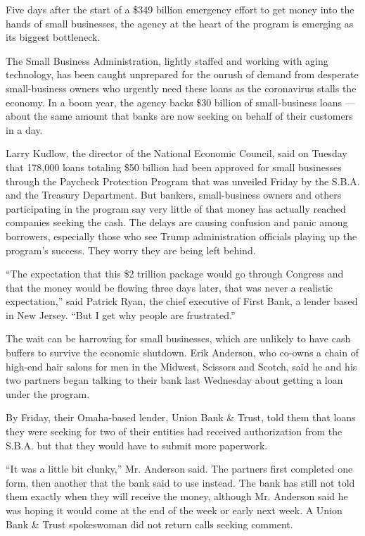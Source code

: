 Five days after the start of a \$349 billion emergency effort to get
money into the hands of small businesses, the agency at the heart of the
program is emerging as its biggest bottleneck.

The Small Business Administration, lightly staffed and working with
aging technology, has been caught unprepared for the onrush of demand
from desperate small-business owners who urgently need these loans as
the coronavirus stalls the economy. In a boom year, the agency backs
\$30 billion of small-business loans --- about the same amount that
banks are now seeking on behalf of their customers in a day.

Larry Kudlow, the director of the National Economic Council, said on
Tuesday that 178,000 loans totaling \$50 billion had been approved for
small businesses through the Paycheck Protection Program that was
unveiled Friday by the S.B.A. and the Treasury Department. But bankers,
small-business owners and others participating in the program say very
little of that money has actually reached companies seeking the cash.
The delays are causing confusion and panic among borrowers, especially
those who see Trump administration officials playing up the program's
success. They worry they are being left behind.

``The expectation that this \$2 trillion package would go through
Congress and that the money would be flowing three days later, that was
never a realistic expectation,'' said Patrick Ryan, the chief executive
of First Bank, a lender based in New Jersey. ``But I get why people are
frustrated.''

The wait can be harrowing for small businesses, which are unlikely to
have cash buffers to survive the economic shutdown. Erik Anderson, who
co-owns a chain of high-end hair salons for men in the Midwest, Scissors
and Scotch, said he and his two partners began talking to their bank
last Wednesday about getting a loan under the program.

By Friday, their Omaha-based lender, Union Bank \& Trust, told them that
loans they were seeking for two of their entities had received
authorization from the S.B.A. but that they would have to submit more
paperwork.

``It was a little bit clunky,'' Mr. Anderson said. The partners first
completed one form, then another that the bank said to use instead. The
bank has still not told them exactly when they will receive the money,
although Mr. Anderson said he was hoping it would come at the end of the
week or early next week. A Union Bank \& Trust spokeswoman did not
return calls seeking comment.


